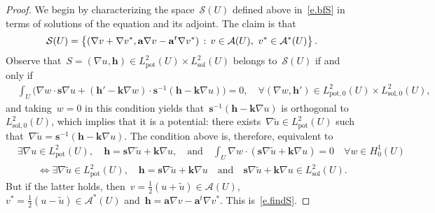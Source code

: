 \documentclass[11pt,twoside]{article} %
\numberwithin{equation}{section}
\theoremstyle{definition}
\let\originalleft\left
\let\originalright\right
\renewcommand{\left}{\mathopen{}\mathclose\bgroup\originalleft}
\renewcommand{\right}{\aftergroup\egroup\originalright}
\renewcommand*{\tilde}{\widetilde}
\newcommand{\s}{\mathbf{s}}
\renewcommand{\a}{\mathbf{a}}
\renewcommand{\k}{\mathbf{k}}
\renewcommand{\S}{\mathcal{S}}
\newcommand{\A}{\mathcal{A}}
\newcommand{\Lsol}{L^2_{\mathrm{sol}}}
\newcommand{\Lsolo}{L^2_{\mathrm{sol,0}}}
\newcommand{\Lpot}{L^2_{\mathrm{pot}}}
\newcommand{\Lpoto}{L^2_{\mathrm{pot,0}}}
\begin{document}
\begin{proof}
We begin by characterizing the space~$\S(U)$ defined above in~\eqref{e.bfS} in terms of solutions of the equation and its adjoint. The claim is that 
\begin{equation}
\label{e.findS}
\S(U)
=
\left\{ (\nabla v+\nabla v^*, \a\nabla v - \a^t\nabla v^*) \,:\, v\in \A(U), \ v^*\in \A^*(U)
\right\}
\,.
\end{equation}
Observe that~$S=(\nabla u,\mathbf{h}) \in \Lpot(U)\times\Lsol(U)$ belongs to~$\S(U)$ if and only if 
\begin{align*}
& 
\int_U \bigl(
\nabla w \cdot \s \nabla u + (\mathbf{h}'-\k\nabla w) \cdot \s^{-1} (\mathbf{h} - \k\nabla u )
\bigr) = 0, \quad \forall (\nabla w,\mathbf{h}') \in \Lpoto(U) \times \Lsolo(U),
\end{align*}
and taking~$w=0$ in this condition yields that~$\s^{-1}(\mathbf{h}-\k\nabla u)$ is orthogonal to~$\Lsolo(U)$, which implies that it is a potential: there exists~$\nabla \tilde u\in \Lpot(U)$ such that~$\nabla \tilde u = \s^{-1}(\mathbf{h}-\k\nabla u)$. The condition above is, therefore, equivalent to 
\begin{align*}
& 
\exists \nabla u \in \Lpot(U), \quad 
\mathbf{h} = \s \nabla \tilde u +\k \nabla u, 
\quad \mbox{and} \quad 
\int_U \nabla w \cdot (\s \nabla \tilde u +\k \nabla u) = 0  \quad \forall w \in H^1_0(U)
\\ & \qquad 
\iff
\exists \nabla \tilde u \in \Lpot(U), \quad 
\mathbf{h} = \s \nabla \tilde u+\k \nabla u 
\quad \mbox{and}\quad
\s \nabla \tilde u +\k \nabla u \in \Lsol(U). 
\end{align*}
But if the latter holds, then~$v = \frac12(u + \tilde u)\in\A(U)$,~$v^* = \frac12(u-\tilde u)\in\A^*(U)$ and~$\mathbf{h} = \a\nabla v - \a^t \nabla v^*$. This is~\eqref{e.findS}. 

\smallskip


\end{proof}
\end{document}
